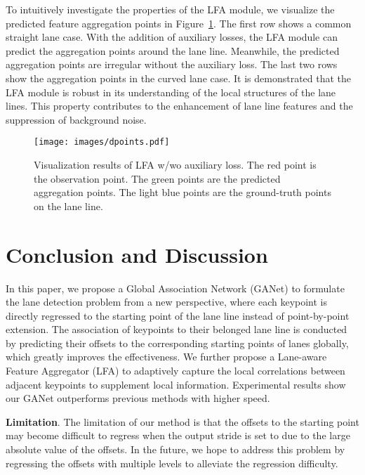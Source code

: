 \documentclass[10pt,twocolumn,letterpaper]{article}
\begin{document}
To intuitively investigate the properties of the LFA module, we visualize the predicted feature aggregation points in Figure~\ref{fig:dpoints}. The first row shows a common straight lane case. With the addition of auxiliary losses, the LFA module can predict the aggregation points around the lane line. Meanwhile, the predicted aggregation points are irregular without the auxiliary loss. The last two rows show the aggregation points in the curved lane case. It is demonstrated that the LFA module is robust in its understanding of the local structures of the lane lines. This property contributes to the enhancement of lane line features and the suppression of background noise.

\begin{figure}[!htbp]
    \centering
    \texttt{[image: images/dpoints.pdf]}
    \caption{Visualization results of LFA w/wo auxiliary loss. The red point is the observation point. The green points are the predicted aggregation points. The light blue points are the ground-truth points on the lane line.}
    \label{fig:dpoints}
\end{figure}

\section{Conclusion and Discussion}
In this paper, we propose a Global Association Network (GANet) to formulate the lane detection problem from a new perspective, where each keypoint is directly regressed to the starting point of the lane line instead of point-by-point extension.
The association of keypoints to their belonged lane line is conducted by predicting their offsets to the corresponding starting points of lanes globally, which greatly improves the effectiveness. 
We further propose a Lane-aware Feature Aggregator (LFA) to adaptively capture the local correlations between adjacent keypoints to supplement local information.
Experimental results show our GANet outperforms previous methods with higher speed.

\textbf{Limitation}. The limitation of our method is that the offsets to the starting point may become difficult to regress when the output stride is set to  due to the large absolute value of the offsets. 
In the future, we hope to address this problem by regressing the offsets with multiple levels to alleviate the regression difficulty.


{\small


}
\end{document}
